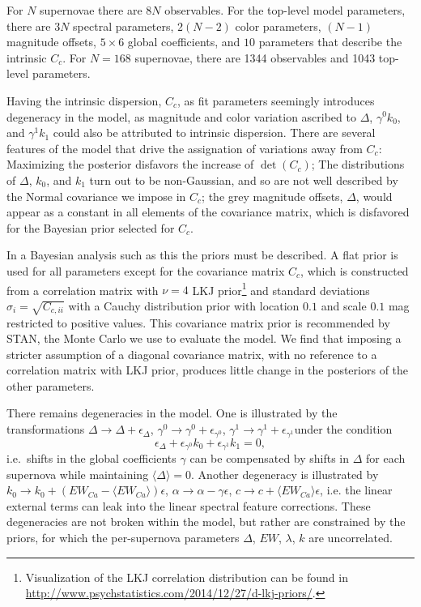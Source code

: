 \documentclass{aastex61}   	%
\begin{document}
\color{red}
For $N$ supernovae there are $8N$ observables.  For the top-level model parameters, there are $3N$ spectral parameters, $2(N-2)$
color parameters, $(N-1)$ magnitude offsets,  $5 \times 6$ global coefficients, and $10$ parameters that describe the intrinsic
$C_c$.  For $N=168$ supernovae, there are 1344 observables and 1043 top-level parameters.
\color{black}

Having the intrinsic dispersion, $C_c$, as fit parameters seemingly introduces degeneracy in the model, as magnitude and color variation
ascribed to $\Delta$, $\gamma^0 k_0$, and $\gamma^1 k_1$ could also be attributed to intrinsic dispersion.  There are several features of the model
that drive the assignation of variations away from $C_c$:  Maximizing the posterior disfavors the increase of $\det{(C_c)}$;
The distributions of $\Delta$, $k_0$, and $k_1$ turn out to
be non-Gaussian, and so are not well described by the Normal covariance we impose in $C_c$; the grey magnitude offsets, $\Delta$, would appear as a constant
in all elements of the covariance matrix, which is disfavored for the Bayesian prior selected for $C_c$.

In a Bayesian analysis such as this the priors must be described.  A flat prior is used for all parameters except
for the covariance matrix $C_c$, which is constructed from a correlation matrix with  $\nu=4$  LKJ prior\footnote{
Visualization of the LKJ correlation distribution can be found in \url{http://www.psychstatistics.com/2014/12/27/d-lkj-priors/}.}
\citep{Lewandowski20091989} and standard
deviations $\sigma_i = \sqrt{C_{c,ii}}$ with a  Cauchy distribution prior with location
 $0.1$ and scale $0.1$ mag restricted to positive values.
This covariance matrix prior is recommended by STAN, the Monte Carlo we use to evaluate the model.
 We find that imposing a stricter assumption of a
 diagonal covariance matrix, with no reference to a correlation matrix with LKJ prior, produces little change in the posteriors of
 the other parameters.

\color{blue}
There remains degeneracies in the model.  One is illustrated by the  transformations $\Delta \rightarrow \Delta  + \epsilon_\Delta$,
 $\gamma^0 \rightarrow \gamma^0  + \epsilon_{\gamma^0}$, $\gamma^1 \rightarrow \gamma^1 + \epsilon_{\gamma^1}$under the condition
$$
\epsilon_\Delta  +  \epsilon_{\gamma^0} k_0+  \epsilon_{\gamma^1} k_1=0,
$$
i.e.\ shifts in the global coefficients $\gamma$ can be compensated by shifts in $\Delta$ for each supernova while maintaining 
$\langle \Delta \rangle=0$.
Another degeneracy is illustrated by $k_0 \rightarrow k_0 + (EW_{Ca}-\langle EW_{Ca}\rangle)\epsilon$,
$\alpha \rightarrow \alpha - \gamma \epsilon$, $c \rightarrow c + \langle EW_{Ca}\rangle \epsilon$, i.e. the
linear external terms can leak into the linear spectral feature corrections.
These degeneracies are not broken within the model, but rather are constrained by the priors, for which the
per-supernova parameters
$\Delta$, $EW$, $\lambda$, $k$ are uncorrelated.
\color{black}
\end{document}
